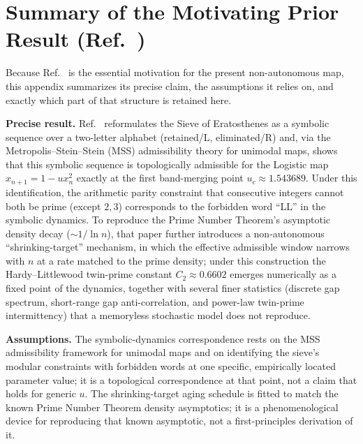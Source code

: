 \documentclass[mca,article,submit,oneauthor,pdftex]{Definitions/mdpi}
\begin{document}
\appendix
\section{Summary of the Motivating Prior Result (Ref.~\cite{wang2026})}\label{sec:wang2026-summary}

Because Ref.~\cite{wang2026} is the essential motivation for the present
non-autonomous map, this appendix summarizes its precise claim, the
assumptions it relies on, and exactly which part of that structure is
retained here.

\textbf{Precise result.} Ref.~\cite{wang2026} reformulates the Sieve of
Eratosthenes as a symbolic sequence over a two-letter alphabet (retained/L,
eliminated/R) and, via the Metropolis--Stein--Stein (MSS) admissibility
theory for unimodal maps, shows that this symbolic sequence is
topologically admissible for the Logistic map $x_{n+1}=1-u x_n^2$ exactly
at the first band-merging point $u_c\approx1.543689$. Under this
identification, the arithmetic parity constraint that consecutive integers
cannot both be prime (except $2,3$) corresponds to the forbidden word
``LL'' in the symbolic dynamics. To reproduce the Prime Number Theorem's
asymptotic density decay ($\sim 1/\ln n$), that paper further introduces a
non-autonomous ``shrinking-target'' mechanism, in which the effective
admissible window narrows with $n$ at a rate matched to the prime density;
under this construction the Hardy--Littlewood twin-prime constant
$C_2\approx0.6602$ emerges numerically as a fixed point of the dynamics,
together with several finer statistics (discrete gap spectrum, short-range
gap anti-correlation, and power-law twin-prime intermittency) that a
memoryless stochastic model does not reproduce.

\textbf{Assumptions.} The symbolic-dynamics correspondence rests on the MSS
admissibility framework for unimodal maps and on identifying the sieve's
modular constraints with forbidden words at one specific, empirically
located parameter value; it is a topological correspondence at that point,
not a claim that holds for generic $u$. The shrinking-target aging schedule
is fitted to match the known Prime Number Theorem density asymptotics; it
is a phenomenological device for reproducing that known asymptotic, not a
first-principles derivation of it.
\end{document}
